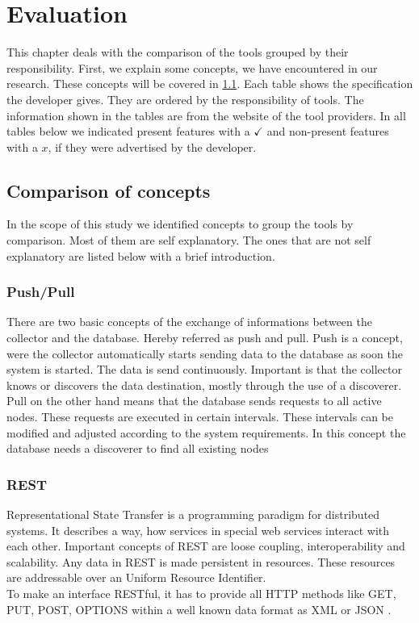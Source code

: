 \chapter{Evaluation} %
This chapter deals with the comparison of the tools grouped by their responsibility. First, we explain some concepts, we have encountered in our research. These concepts will be covered in \cref{concepts}.
Each table shows the specification the developer gives. They are ordered by the responsibility of tools. The information shown in the tables are from the website of the tool providers.
In all tables below we indicated present features with a $ \checkmark $ and non-present features with a $ x $, if they were advertised by the developer.
\section{Comparison of concepts}
\label{concepts}
In the scope of this study we identified concepts to group the tools by comparison. Most of them are self explanatory. The ones that are not self explanatory are listed below with a brief introduction.
\subsection{Push/Pull}
\label{push/pull}
There are two basic concepts of the exchange of informations between the collector and the database. Hereby referred as push and pull. Push \cite{5557986} is a concept, were the collector  automatically starts sending data to the database as soon the system is started. The data is send continuously. Important is that the collector knows or discovers the data destination, mostly through the use of a discoverer.
Pull \cite{5557986} on the other hand means that the database sends requests to all active nodes. These requests are executed in certain intervals. These intervals can be modified and adjusted according to the system requirements. In this concept the database needs a discoverer to find all existing nodes
\subsection{REST}
\label{rest}
Representational State Transfer is a programming paradigm for distributed systems. It describes a way, how services in special web services interact with each other. Important concepts of REST are loose coupling, interoperability and scalability. Any data in REST is made persistent in resources. These resources are addressable over an Uniform Resource Identifier. \\
To make an interface RESTful, it has to provide all HTTP methods like GET, PUT, POST, OPTIONS within a well known data format as XML or JSON \cite{rest}.


